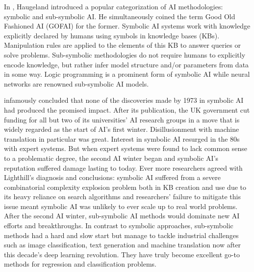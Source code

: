 In \cite{haugeland1989artificial}, Haugeland introduced a popular categorization of AI methodologies: symbolic and sub-symbolic AI. He simultaneously coined the term Good Old Fashioned AI (GOFAI) for the former. Symbolic AI systems work with knowledge explicitly declared by humans using symbols in knowledge bases (KBs). Manipulation rules are applied to the elements of this KB to answer queries or solve problems. Sub-symbolic methodologies do not require humans to explicitly encode knowledge, but rather infer model structure and/or parameters from data in some way. Logic programming is a prominent form of symbolic AI while neural networks are renowned sub-symbolic AI models. \par
\cite{lighthill1973ai} infamously concluded that none of the discoveries made by 1973 in symbolic AI had produced the promised impact. After its publication, the UK government cut funding for all but two of its universities' AI research groups in a move that is widely regarded as the start of AI's first winter. Disillusionment with machine translation in particular was great. Interest in symbolic AI resurged in the 80s with expert systems. But when expert systems were found to lack common sense to a problematic degree, the second AI winter began and symbolic AI's reputation suffered damage lasting to today. Ever more researchers agreed with Lighthill's diagnosis and conclusions: symbolic AI suffered from a severe combinatorial complexity explosion problem both in KB creation and use due to its heavy reliance on search algorithms and researchers' failure to mitigate this issue meant symbolic AI was unlikely to ever scale up to real world problems. After the second AI winter, sub-symbolic AI methods would dominate new AI efforts and breakthroughs. In contrast to symbolic approaches, sub-symbolic methods had a hard and slow start but manage to tackle industrial challenges such as image classification, text generation and machine translation now after this decade's deep learning revolution. They have truly become excellent go-to methods for regression and classification problems. \par
